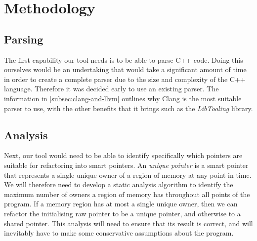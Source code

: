 \documentclass{mpaper}
\begin{document}
    \vskip50pt



    \section{Methodology}\label{sec:methodology}
    
    \subsection{Parsing}
    
    The first capability our tool needs is to be able to parse C++ code.
    Doing this ourselves would be an undertaking that would take a significant amount of time in order to create a complete parser due to the size and complexity of the C++ language. Therefore it was decided early to use an existing parser.
    The information in \autoref{subsec:clang-and-llvm} outlines why Clang is the most suitable parser to use, with the other benefits that it brings such as the \emph{LibTooling} library. 
    
    \subsection{Analysis}\label{subsec:methodology-analysis}
    
    Next, our tool would need to be able to identify specifically which pointers are suitable for refactoring into smart pointers.
    An \emph{unique pointer} is a smart pointer that represents a single unique owner of a region of memory at any point in time.
    We will therefore need to develop a static analysis algorithm to identify the maximum number of owners a region of memory has throughout all points of the program. 
    If a memory region has at most a single unique owner, then we can refactor the initialising raw pointer to be a unique pointer, and otherwise to a shared pointer.    
    This analysis will need to ensure that its result is correct, and will inevitably have to make some conservative assumptions about the program.
    
\end{document}
